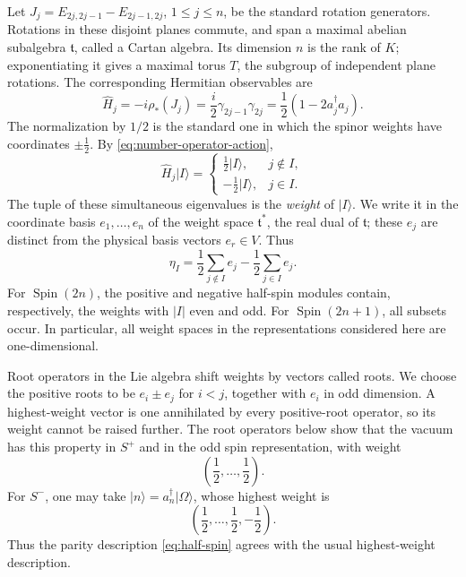 \documentclass{article}
\theoremstyle{definition}
\theoremstyle{remark}
\newcommand{\vac}{|\Omega\rangle}
\newcommand{\Spin}{\operatorname{Spin}}
\newcommand{\ket}[1]{\lvert #1\rangle}
\begin{document}
Let
$J_j=E_{2j,2j-1}-E_{2j-1,2j}$, $1\le j\le n$, be the standard
rotation generators. Rotations in these disjoint planes commute, and
span a maximal abelian subalgebra $\mathfrak t$, called a Cartan algebra.
Its dimension $n$ is the rank of $K$; exponentiating it gives a maximal
torus $T$, the subgroup of independent plane rotations. The corresponding
Hermitian observables are
\begin{equation}
 \widehat H_j=-i\rho_*(J_j)
 =\frac{i}{2}\gamma_{2j-1}\gamma_{2j}
 =\frac12(1-2a_j^\dagger a_j).
 \label{eq:cartan-observables}
\end{equation}
The normalization by $1/2$ is the standard one in which the spinor
weights have coordinates $\pm\frac12$.  By
\eqref{eq:number-operator-action},
\begin{equation}
 \widehat H_j\ket I
 =
 \begin{cases}
  \frac12\ket I,&j\notin I,\\
  -\frac12\ket I,&j\in I.
 \end{cases}
\end{equation}
The tuple of these simultaneous eigenvalues is the \emph{weight} of
$\ket I$. We write it in the coordinate basis $e_1,\ldots,e_n$ of the
weight space $\mathfrak t^*$, the real dual of $\mathfrak t$; these $e_j$
are distinct from the physical
basis vectors $e_r\in V$. Thus
\begin{equation}
 \eta_I
 =\frac12\sum_{j\notin I}e_j-\frac12\sum_{j\in I}e_j.
 \label{eq:general-fock-weight}
\end{equation}
For $\Spin(2n)$, the positive and negative half-spin modules contain,
respectively, the weights with $|I|$ even and odd.  For $\Spin(2n+1)$,
all subsets occur.  In particular, all weight spaces in the representations
considered here are one-dimensional.

Root operators in the Lie algebra shift weights by vectors called roots. We
choose the positive roots to be $e_i\pm e_j$ for $i<j$, together
with $e_i$ in odd dimension. A highest-weight vector is one annihilated
by every positive-root operator, so its weight cannot be raised further.
The root operators below show that the vacuum has this property in $S^+$
and in the odd spin representation, with weight
\begin{equation*}
 \left(\frac12,\ldots,\frac12\right).
\end{equation*}
For $S^-$, one may take $\ket n=a_n^\dagger\vac$, whose highest weight
is
\begin{equation*}
 \left(\frac12,\ldots,\frac12,-\frac12\right).
\end{equation*}
Thus the parity description \eqref{eq:half-spin} agrees with the usual
highest-weight description.
\end{document}
